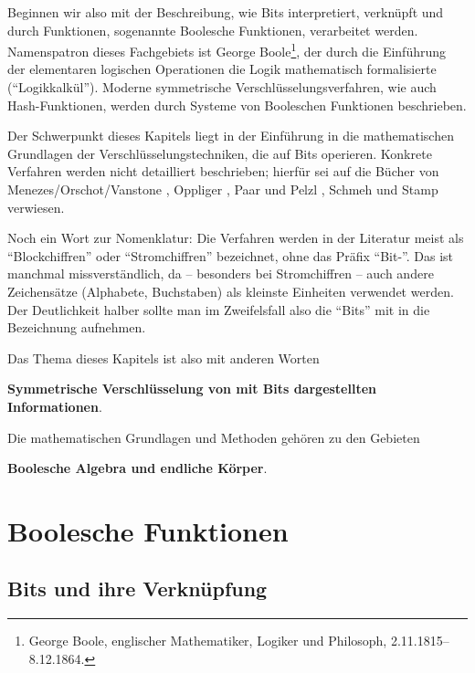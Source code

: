 \begin{refsegment}
Beginnen wir also mit der Beschreibung, wie Bits interpretiert, verknüpft
und durch Funktionen, sogenannte Boolesche
Funktionen, verarbeitet werden.
Namenspatron dieses Fachgebiets ist
George Boole\footnote{%
  George Boole, englischer Mathematiker, Logiker und Philosoph,
  2.11.1815--8.12.1864.
},
der durch die Einführung der elementaren logischen Operationen die Logik
mathematisch formalisierte ("`Logikkalkül"').
Moderne symmetrische Verschlüsselungsverfahren, wie auch
Hash-Funktionen,
werden durch Systeme von Booleschen Funktionen beschrieben.

Der Schwerpunkt dieses Kapitels liegt in der Einführung in die
mathematischen Grundlagen der Verschlüsselungstechniken, die auf
Bits operieren. Konkrete Verfahren werden nicht detailliert beschrieben;
hierfür sei auf die Bücher von
Menezes/Orschot/Vanstone \cite{Menezes2001},
Oppliger \cite{Oppliger2011},
Paar und Pelzl \cite{PaPe2009},
Schmeh \cite{Schm2003, Schm2016}
und Stamp \cite{Stamp2007} verwiesen.

Noch ein Wort zur Nomenklatur: Die Verfahren werden in der Literatur
meist als "`Blockchiffren"' oder
"`Stromchiffren"' bezeichnet, ohne
das Präfix "`Bit-"'. Das ist manchmal missverständlich, da -- besonders
bei Stromchiffren -- auch andere Zeichensätze (Alphabete, Buchstaben)
als kleinste Einheiten verwendet werden. Der Deutlichkeit halber
sollte man im Zweifelsfall also die "`Bits"' mit in die Bezeichnung
aufnehmen.

Das Thema dieses Kapitels ist also mit anderen Worten

   \textbf{Symmetrische Verschlüsselung von mit Bits dargestellten Informationen}.

Die mathematischen Grundlagen und Methoden gehören zu den Gebieten

   \textbf{Boolesche Algebra
   und endliche Körper}.


\newpage
\section{Boolesche Funktionen}\label{s-bool-fct}
\subsection{Bits und ihre Verknüpfung}\label{s-bool-bit}


\end{refsegment}
